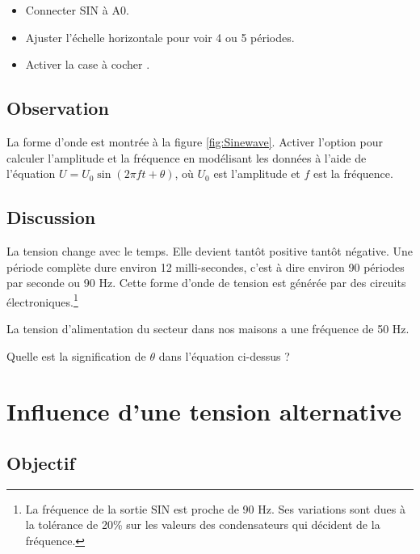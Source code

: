 \documentclass{book}
\begin{document}
\begin{itemize}
  \item Connecter SIN à A0.
  \item Ajuster l'échelle horizontale pour voir 4 ou 5 périodes.
  \item Activer la case à cocher  .
\end{itemize}

\subsection{Observation}


La forme d'onde est montrée à la figure  \ref{fig:Sinewave}. Activer l'option   pour calculer l'amplitude et la fréquence en modélisant les données à l'aide de l'équation $U=U_{0}\sin(2\pi ft+\theta)$, où $U_{0}$  est l'amplitude et $f$  est la fréquence.

\subsection{Discussion}


La tension change avec le temps. Elle devient tantôt positive tantôt négative. Une période complète dure environ 12 milli-secondes, c'est à dire environ 90 périodes par seconde ou 90 Hz. Cette forme d'onde de tension est générée par des circuits électroniques.\footnote{La fréquence de la sortie SIN est proche de 90 Hz. Ses variations sont dues à la tolérance de 20\%{} sur les valeurs des condensateurs qui décident de la fréquence.}



La tension d'alimentation du secteur dans nos maisons a une fréquence de 50 Hz.



Quelle est la signification de $\theta$ dans l'équation ci-dessus ?










\section{Influence d'une tension alternative}



\subsection{Objectif}
\end{document}
